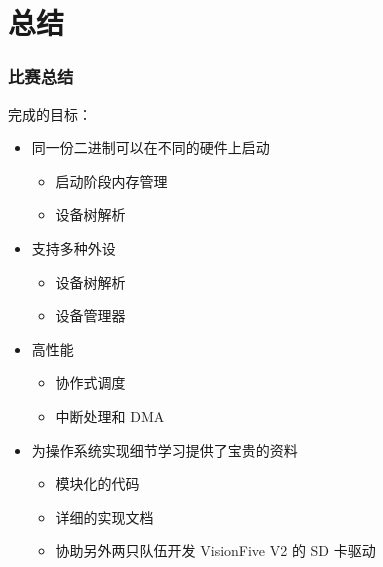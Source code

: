 \section{总结}

\begin{frame}
    \frametitle{比赛总结}

    完成的目标：
    \begin{itemize}
        \item 同一份二进制可以在不同的硬件上启动
              \begin{itemize}
                  \item 启动阶段内存管理
                  \item 设备树解析
              \end{itemize}
        \item 支持多种外设
              \begin{itemize}
                  \item 设备树解析
                  \item 设备管理器
              \end{itemize}
        \item 高性能
              \begin{itemize}
                  \item 协作式调度
                  \item 中断处理和 DMA
              \end{itemize}
        \item 为操作系统实现细节学习提供了宝贵的资料
              \begin{itemize}
                  \item 模块化的代码
                  \item 详细的实现文档
                  \item 协助另外两只队伍开发 VisionFive V2 的 SD 卡驱动
              \end{itemize}
    \end{itemize}

\end{frame}
